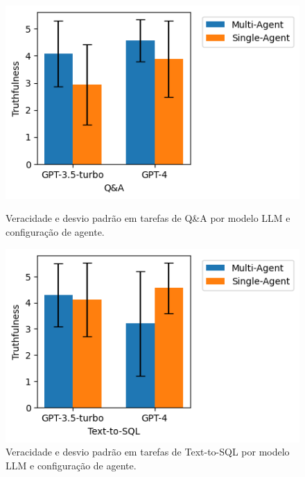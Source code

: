             \begin{figure}[h]
                \centering
                \begin{minipage}{.485\textwidth}
                    \centering           
                    \includegraphics[width=1\linewidth]{images/truthfulness_QA.png}
                    \caption{Veracidade e desvio padrão em tarefas de Q\&A por modelo LLM e configuração de agente. \\ }
                    \label{fig:truthfulness_QA}
                \end{minipage}%
                \hspace{0.2cm}
                \begin{minipage}{.455\textwidth}
                    \centering
                    \includegraphics[width=1\linewidth]{images/truthfulness_text2sql.png}
                    \caption{Veracidade e desvio padrão em tarefas de Text-to-SQL por modelo LLM e configuração de agente.}
                    \label{fig:truthfulness_text2sql}
                \end{minipage}
            \end{figure}
    

